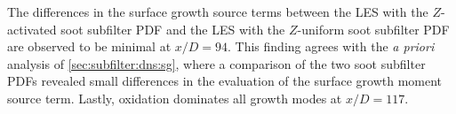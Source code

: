 The differences in the surface growth source terms between the LES with the $Z$-activated soot subfilter PDF and the LES with the $Z$-uniform soot subfilter PDF are observed to be minimal at $x/D = 94$. This finding agrees with the \textit{a priori} analysis of \cref{sec:subfilter:dns:sg}, where a comparison of the two soot subfilter PDFs revealed small differences in the evaluation of the surface growth moment source term. Lastly, oxidation dominates all growth modes at $x/D = 117$. %


